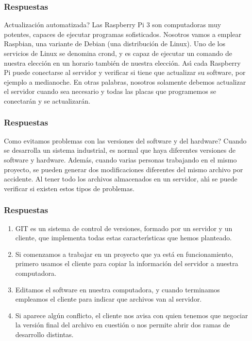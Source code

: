 \documentclass{beamer}
\begin{document}

\begin{frame}
\frametitle{Respuestas}
\begin{block}{\textquestiondown Actualizaci\'{o}n automatizada?}
Las Raspberry Pi 3 son computadoras muy potentes, capaces de ejecutar programas sofisticados. Nosotros vamos a emplear Raspbian, 
una variante de Debian (una distribuci\'{o}n de Linux). Uno de los servicios de Linux se denomina crond, y es capaz de ejecutar un comando de nuestra elecci\'{o}n en un horario tambi\'{e}n de nuestra elecci\'{o}n. As\'{\i} cada Raspberry Pi puede conectarse al servidor y verificar si tiene que actualizar su software, por ejemplo a medianoche. En otras palabras, nosotros solamente debemos actualizar el servidor cuando sea necesario y todas las placas que programemos se conectar\'{a}n y se actualizar\'{a}n.
\end{block}
\end{frame}

\begin{frame}
\frametitle{Respuestas}
\begin{block}{\textquestiondown Como evitamos problemas con las versiones del software y del hardware?}
Cuando se desarrolla un sistema industrial, es normal que haya diferentes versiones de software y hardware.
Adem\'{a}s, cuando varias personas trabajando en el mismo proyecto, se pueden generar dos modificaciones diferentes del mismo archivo por accidente. Al tener todo los archivos almacenados en un servidor, ah\'{\i} se puede verificar si existen estos tipos de problemas.
\end{block}
\end{frame}

\begin{frame}
\frametitle{Respuestas}

\begin{enumerate}
\item GIT es un sistema de control de versiones, formado por un servidor y un cliente, que implementa todas estas caracter\'{\i}sticas que hemos planteado.
\item Si comenzamos a trabajar en un proyecto que ya est\'{a} en funcionamiento, primero usamos el cliente para copiar la informaci\'{o}n del servidor a nuestra computadora.
\item Editamos el software en nuestra computadora, y cuando terminamos empleamos el cliente para indicar que archivos van al servidor.
\item Si aparece alg\'{u}n conflicto, el cliente nos avisa con quien tenemos que negociar la versi\'{o}n final del archivo en cuesti\'{o}n o nos permite abrir dos ramas de desarrollo distintas.
\end{enumerate}

\end{frame}
\end{document}
